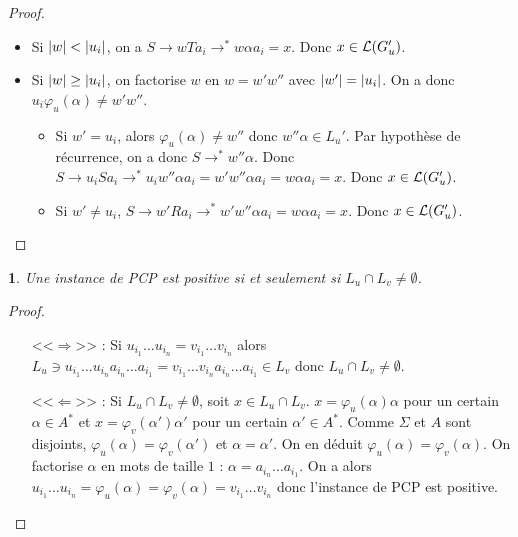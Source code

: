 \documentclass[11pt,a4paper]{article}
\theoremstyle{plain}
\theoremstyle{definition}
\theoremstyle{definition}
\theoremstyle{remark}
\theoremstyle{remark}
\theoremstyle{plain}
\newtheorem{lem}[thm]{\protect\lemmaname}
\theoremstyle{plain}
\theoremstyle{plain}
\theoremstyle{remark}
\providecommand{\lemmaname}{Lemme}
\begin{document}
\begin{proof}
\begin{itemize}
\begin{itemize}
			\begin{itemize}
				\item Si $\left|w\right|<\left|u_i\right|$, on a $S\to wTa_i\to^* w\alpha a_i=x$. Donc $x\in \mathcal{L}(G_u')$.
				\item Si $\left|w\right|\ge \left|u_i\right|$, on factorise $w$ en $w=w'w''$ avec $\left|w'\right|=\left|u_i\right|$. On a donc $u_i\varphi_u(\alpha)\not= w'w''$.
				\begin{itemize}
					\item Si $w'=u_i$, alors $\varphi_u(\alpha)\not=w''$ donc $w''\alpha\in L_u'$. Par hypothèse de récurrence, on a donc $S\to^* w''\alpha$. Donc $S\to u_iSa_i\to^*u_i w''\alpha a_i=w'w''\alpha a_i=w\alpha a_i = x$. Donc $x\in \mathcal{L}(G_u')$.
					\item Si $w'\not= u_i$, $S\to w'Ra_i\to^* w'w''\alpha a_i=w\alpha a_i = x$. Donc $x\in \mathcal{L}(G_u')$.
				\end{itemize}
			\end{itemize}
		\end{itemize}
	\end{itemize}
\end{proof}

\begin{lem}
	Une instance de PCP est positive si et seulement si $L_u\cap L_v\not= \emptyset$.
\end{lem}

\begin{proof}
	\begin{itemize}
		\item[<<$\Rightarrow$>>] : Si $u_{i_1}\dots u_{i_n}=v_{i_1}\dots v_{i_n}$ alors $L_u\ni u_{i_1}\dots u_{i_n}a_{i_n}\dots a_{i_1}=v_{i_1}\dots v_{i_n}a_{i_n}\dots a_{i_1}\in L_v$ donc $L_u\cap L_v \not= \emptyset$.
		\item[<<$\Leftarrow$>>] : Si $L_u\cap L_v \not= \emptyset$, soit $x\in L_u\cap L_v$. $x = \varphi_u(\alpha)\alpha$ pour un certain $\alpha \in A^*$ et $x = \varphi_v(\alpha')\alpha'$ pour un certain $\alpha'\in A^*$. Comme $\Sigma$ et $A$ sont disjoints, $\varphi_u(\alpha)=\varphi_v(\alpha')$ et $\alpha=\alpha'$. On en déduit $\varphi_u(\alpha)=\varphi_v(\alpha)$. On factorise $\alpha$ en mots de taille $1$ : $\alpha = a_{i_n}\dots a_{i_1}$. On a alors $u_{i_1}\dots u_{i_n}=\varphi_u(\alpha)=\varphi_v(\alpha)=v_{i_1}\dots v_{i_n}$ donc l'instance de PCP est positive.
	\end{itemize}
\end{proof}
\end{document}
